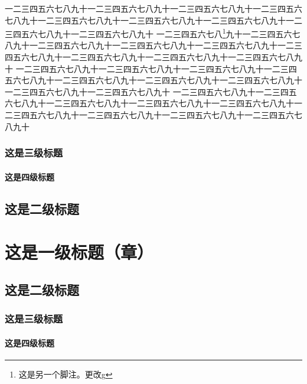 \documentclass{scipub}
\begin{document}
一二三四五六七八九十一二三四五六七八九十一二三四五六七八九十一二三四五六七八九十一二三四五六七八九十一二三四五六七八九十一二三四五六七八九十一二三四五六七八九十一二三四五六七八九十
一二三四五六七八\footnote{这是另一个脚注。更改g}九十一二三四五六七八九十一二三四五六七八九十一二三四五六七八九十一二三四五六七八九十一二三四五六七八九十一二三四五六七八九十一二三四五六七八九十一二三四五六七八九十
一二三四五六七八九十一二三四五六七八九十一二三四五六七八九十一二三四五六七八九十一二三四五六七八九十一二三四五六七八九十一二三四五六七八九十一二三四五六七八九十一二三四五六七八九十
一二三四五六七八九十一二三四五六七八九十一二三四五六七八九十一二三四五六七八九十一二三四五六七八九十一二三四五六七八九十一二三四五六七八九十一二三四五六七八九十一二三四五六七八九十

\subsection{这是三级标题}
\subsubsection{这是四级标题}
\section{这是二级标题}


\chapter{这是一级标题（章）}
\section{这是二级标题}
\subsection{这是三级标题}
\subsubsection{这是四级标题}
\end{document}
